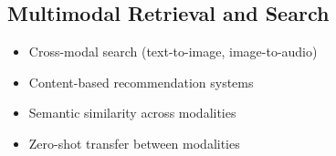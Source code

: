 \subsection{Multimodal Retrieval and Search}
\begin{itemize}
\item Cross-modal search (text-to-image, image-to-audio)
\item Content-based recommendation systems
\item Semantic similarity across modalities
\item Zero-shot transfer between modalities
\end{itemize}

\begin{comment}
Feedback: Important, all above sections need enough reference support. Do research, put them in the top level bib file, and ref in the relevant sections above.
\end{comment}
